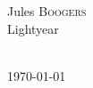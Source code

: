 \begin{titlepage}
\begin{minipage}[t]{0.45\textwidth}
\begin{flushright}
Jules \textsc{Boogers}\\
Lightyear
\end{flushright}
\end{minipage}\\[4cm]


{\large \today}\\[3cm] %


\vfill %

\end{titlepage}